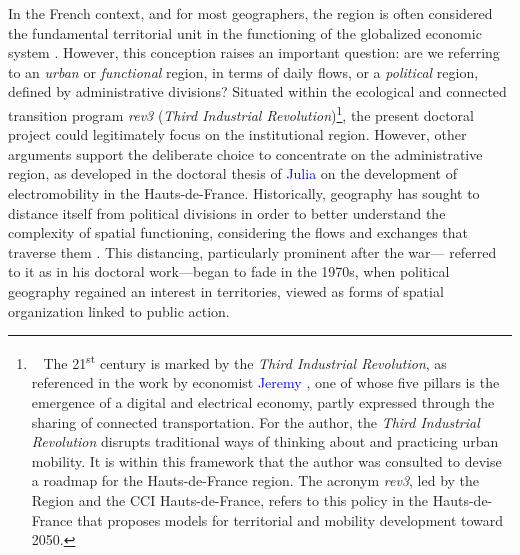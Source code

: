\begin{refsegment}
In the French context, and for most geographers, the region is often considered the fundamental territorial unit in the functioning of the globalized economic system \textcolor{blue}{\autocite[]{calthorpe_regional_2001}}. However, this conception raises an important question: are we referring to an \textsl{urban} or \textsl{functional} region, in terms of daily flows, or a \textsl{political} region, defined by administrative divisions? Situated within the ecological and connected transition program \textsl{rev3} (\textsl{Third Industrial Revolution})\footnote{~
    The 21\textsuperscript{st} century is marked by the \textsl{Third Industrial Revolution}, as referenced in the work by economist \textcolor{blue}{Jeremy} \textcolor{blue}{\textcite[338]{rifkin_troisieme_2012}}, one of whose five pillars is the emergence of a digital and electrical economy, partly expressed through the sharing of connected transportation. For the author, the \textsl{Third Industrial Revolution} disrupts traditional ways of thinking about and practicing urban mobility. It is within this framework that the author was consulted to devise a roadmap for the Hauts-de-France region. The acronym \textsl{rev3}, led by the Region and the \acrfull{CCI} Hauts-de-France, refers to this policy in the Hauts-de-France that proposes models for territorial and mobility development toward 2050.
}, the present doctoral project could legitimately focus on the institutional region. However, other arguments support the deliberate choice to concentrate on the administrative region, as developed in the doctoral thesis of \textcolor{blue}{Julia} \textcolor{blue}{\textcite[166]{frotey_acteurs_2021}} on the development of electromobility in the Hauts-de-France. Historically, geography has sought to distance itself from political divisions in order to better understand the complexity of spatial functioning, considering the flows and exchanges that traverse them \textcolor{blue}{\autocite[]{pumain_regionalisation_2016}}. This distancing, particularly prominent after the war—\textcolor{blue}{\textcite[16-18]{menerault_reseaux_1991}} referred to it as  in his doctoral work—began to fade in the 1970s, when political geography regained an interest in territories, viewed as forms of spatial organization linked to public action.%


\end{refsegment}
